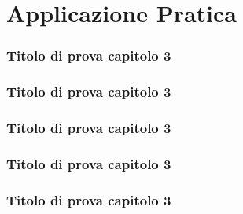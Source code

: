 \documentclass[pdf, aspectratio=169]{beamer}\usepackage[]{graphicx}\usepackage[]{color}
\theoremstyle{definition}
\begin{document}
\section{Applicazione Pratica}

\begin{frame}
\frametitle{Titolo di prova capitolo 3}

\end{frame}



\begin{frame}
\frametitle{Titolo di prova capitolo 3}

\end{frame}


\begin{frame}
\frametitle{Titolo di prova capitolo 3}

\end{frame}


\begin{frame}
\frametitle{Titolo di prova capitolo 3}

\end{frame}


\begin{frame}
\frametitle{Titolo di prova capitolo 3}

\end{frame}
\end{document}
